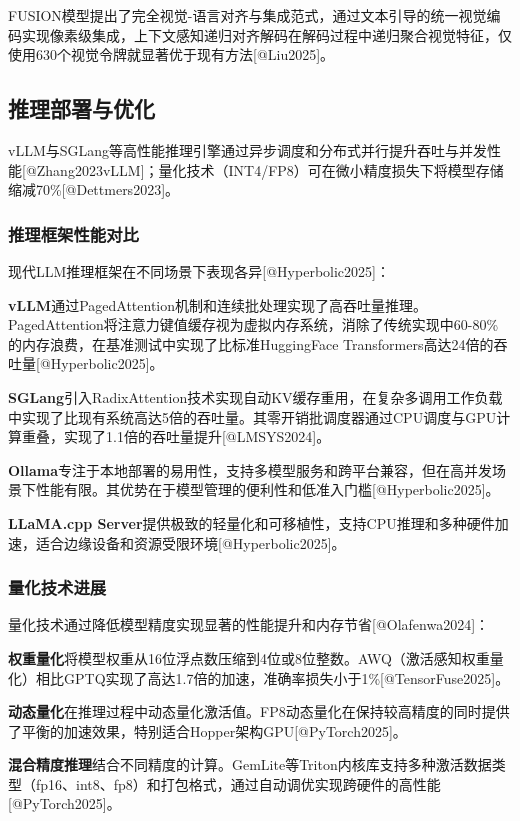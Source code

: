 \documentclass{article}
\begin{document}
FUSION模型提出了完全视觉-语言对齐与集成范式，通过文本引导的统一视觉编码实现像素级集成，上下文感知递归对齐解码在解码过程中递归聚合视觉特征，仅使用630个视觉令牌就显著优于现有方法[@Liu2025]。

\subsection{推理部署与优化}
vLLM与SGLang等高性能推理引擎通过异步调度和分布式并行提升吞吐与并发性能[@Zhang2023vLLM]；量化技术（INT4/FP8）可在微小精度损失下将模型存储缩减70\%[@Dettmers2023]。

\subsubsection{推理框架性能对比}
现代LLM推理框架在不同场景下表现各异[@Hyperbolic2025]：

\textbf{vLLM}通过PagedAttention机制和连续批处理实现了高吞吐量推理。PagedAttention将注意力键值缓存视为虚拟内存系统，消除了传统实现中60-80\%的内存浪费，在基准测试中实现了比标准HuggingFace Transformers高达24倍的吞吐量[@Hyperbolic2025]。

\textbf{SGLang}引入RadixAttention技术实现自动KV缓存重用，在复杂多调用工作负载中实现了比现有系统高达5倍的吞吐量。其零开销批调度器通过CPU调度与GPU计算重叠，实现了1.1倍的吞吐量提升[@LMSYS2024]。

\textbf{Ollama}专注于本地部署的易用性，支持多模型服务和跨平台兼容，但在高并发场景下性能有限。其优势在于模型管理的便利性和低准入门槛[@Hyperbolic2025]。

\textbf{LLaMA.cpp Server}提供极致的轻量化和可移植性，支持CPU推理和多种硬件加速，适合边缘设备和资源受限环境[@Hyperbolic2025]。

\subsubsection{量化技术进展}
量化技术通过降低模型精度实现显著的性能提升和内存节省[@Olafenwa2024]：

\textbf{权重量化}将模型权重从16位浮点数压缩到4位或8位整数。AWQ（激活感知权重量化）相比GPTQ实现了高达1.7倍的加速，准确率损失小于1\%[@TensorFuse2025]。

\textbf{动态量化}在推理过程中动态量化激活值。FP8动态量化在保持较高精度的同时提供了平衡的加速效果，特别适合Hopper架构GPU[@PyTorch2025]。

\textbf{混合精度推理}结合不同精度的计算。GemLite等Triton内核库支持多种激活数据类型（fp16、int8、fp8）和打包格式，通过自动调优实现跨硬件的高性能[@PyTorch2025]。
\end{document}
